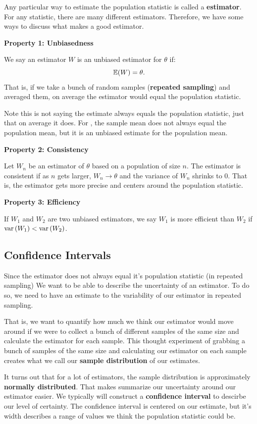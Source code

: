 \documentclass[12pt]{article}
\begin{document}
Any particular way to estimate the population statistic is called a \textbf{estimator}. For any statistic, there are many different estimators. Therefore, we have some ways to discuss what makes a good estimator.

\textbf{Property 1: \textbf{Unbiasedness}} 

We say an estimator $W$ is an unbiased estimator for $\theta$ if:
$$
  \expec{W} = \theta.
$$
That is, if we take a bunch of random samples (\textbf{repeated sampling}) and averaged them, on average the estimator would equal the population statistic.

Note this is not saying the estimate always equals the population statistic, just that on average it does. For , the sample mean does not always equal the population mean, but it is an unbiased estimate for the population mean.

\textbf{Property 2: \textbf{Consistency}}

Let $W_n$ be an estimator of $\theta$ based on a population of size $n$. The estimator is consistent if as $n$ gets larger, $W_n \to \theta$ and the variance of $W_n$ shrinks to 0. That is, the estimator gets more precise and centers around the population statistic.

\textbf{Property 3: \textbf{Efficiency}}

If $W_1$ and $W_2$ are two unbiased estimators, we say $W_1$ is more efficient than $W_2$ if $\var{W_1} < \var{W_2}$.


\subsection*{Confidence Intervals}

Since the estimator does not always equal it's population statistic (in repeated sampling) We want to be able to describe the uncertainty of an estimator. To do so, we need to have an estimate to the variability of our estimator in repeated sampling. 

That is, we want to quantify how much we think our estimator would move around if we were to collect a bunch of different samples of the same size and calculate the estimator for each sample. This thought experiment of grabbing a bunch of samples of the same size and calculating our estimator on each sample creates what we call our \textbf{sample distribution} of our estimates. 


It turns out that for a lot of estimators, the sample distribution is approximately \textbf{normally distributed}. That makes summarize our uncertainty around our estimator easier. We typically will construct a \textbf{confidence interval} to descirbe our level of certainty. The confidence interval is centered on our estimate, but it's width describes a range of values we think the population statistic could be. 
\end{document}
